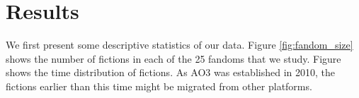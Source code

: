 \documentclass[a4paper]{article}
\begin{document}







\section{Results} 
We first present some descriptive statistics of our data. Figure \ref{fig:fandom_size} shows the number of fictions in each of the 25 fandoms that we study. Figure  shows the time distribution of fictions. As AO3 was established in 2010, the fictions earlier than this time might be migrated from other platforms. 
\end{document}
